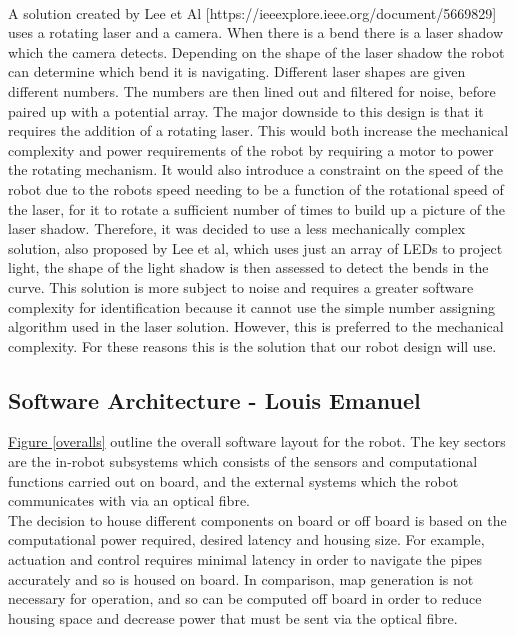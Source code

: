 \documentclass[11pt]{article}		%
\newcommand{\figref}[1]{\hyperref[#1]{Figure \ref*{#1}}}    %
\begin{document}
	        \\
	        A solution created by Lee et Al [https://ieeexplore.ieee.org/document/5669829] uses a rotating laser and a camera. 
	        When there is a bend there is a laser shadow which the camera detects. 
	        Depending on the shape of the laser shadow the robot can determine which bend it is navigating. 
	       	Different laser shapes are given different numbers. 
	       	The numbers are then lined out and filtered for noise, before paired up with a potential array. 
	       	The major downside to this design is that it requires the addition of a rotating laser. 
	       	This would both increase the mechanical complexity and power requirements of the robot by requiring a motor to power the rotating mechanism. 
	       	It would also introduce a constraint on the speed of the robot due to the robots speed needing to be a function of the rotational speed of the laser, for it to rotate a sufficient number of times to build up a picture of the laser shadow. 
	       	Therefore, it was decided to use a less mechanically complex solution, also proposed by Lee et al, which uses just an array of LEDs to project light, the shape of the light shadow is then assessed to detect the bends in the curve. 
	       	This solution is more subject to noise and requires a greater software complexity for identification because it cannot use the simple number assigning algorithm used in the laser solution. 
	       	However, this is preferred to the mechanical complexity. 
	       	For these reasons this is the solution that our robot design will use.
        
        \subsection[Software Architecture] {Software Architecture - Louis Emanuel}
        
	         \figref{overalls} outline the overall software layout for the robot. The key sectors are the in-robot subsystems which consists of the sensors and computational functions carried out on board, and the external systems which the robot communicates with via an optical fibre. \\
	
	         \hspace*{3ex}The decision to house different components on board or off board is based on the computational power required, desired latency and housing size. For example, actuation and control requires minimal latency in order to navigate the pipes accurately and so is housed on board. In comparison, map generation is not necessary for operation, and so can be computed off board in order to reduce housing space and decrease power that must be sent via the optical fibre. \\
	
\end{document}
